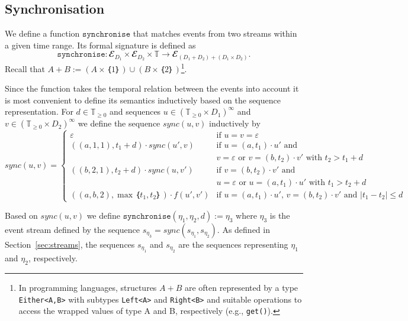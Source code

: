 \subsection{Synchronisation}

We define a function $\mathtt{synchronise}$ that matches events from two streams within a given time range.
Its formal signature is defined as
\[
  \mathtt{synchronise}: 𝓔_{D_1} × 𝓔_{D_2} × 𝕋 → 𝓔_{(D_1+D_2)+(D_1×D_2)}.
\]
Recall that $A+B:= (A×｛1｝)∪(B×｛2｝)$\footnote{In programming languages, structures $A+B$ are often represented by a type \texttt{Either<A,B>} with subtypes \texttt{Left<A>} and \texttt{Right<B>} and suitable operations to access the wrapped values of type A and B, respectively (e.g., \texttt{get()}).}.

Since the function takes the temporal relation between the events into account it is most convenient to define its semantics inductively based on the sequence representation.
For $d∈𝕋_{≥0}$ and sequences $u∈(𝕋_{≥0}×D_1)^∞$ and $v∈(𝕋_{≥0}×D_2)^∞$ we define the sequence $sync(u,v)$ inductively by 
\[
sync(u,v) = \begin{cases}
  ε & \text{if } u=v=ε \\
  ((a,1,1),t_1+d) · sync(u',v) & \text{if } u=(a,t_1) ·u' \text{ and } \\
                                   & v=ε \text{ or } v=(b,t_2)·v' \text{ with } t_2>t_1+d\\
  ((b,2,1),t_2+d) · sync(u,v') & \text{if } v=(b,t_2)·v' \text{ and } \\
                                   & u=ε \text{ or } u=(a,t_1)·u' \text{ with } t_1>t_2+d\\
  ((a,b,2),\max｛t_1,t_2｝) · f(u',v') & \text{if } u=(a,t_1)·u' \text{, } v=(b,t_2)·v' \text{ and } |t_1-t_2|≤d
\end{cases}
\]

Based on $sync(u,v)$ we define $\mathtt{synchronise}(η_1,η_2,d) := η_3$ where $η_3$ is the event stream defined by the sequence $s_{η_3} = sync(s_{η_1}, s_{η_2})$. 
As defined in Section~\ref{sec:streams}, the sequences $s_{η_1}$ and $s_{η_2}$ are the sequences representing $η_1$ and $η_2$, respectively.

